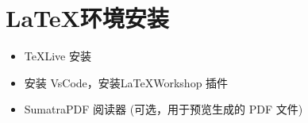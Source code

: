 \section{\LaTeX 环境安装}

\begin{itemize}
    \item \TeX Live 安装
    \item 安装 VsCode，安装\LaTeX Workshop 插件
    \item SumatraPDF 阅读器 (可选，用于预览生成的 PDF 文件)
\end{itemize}

